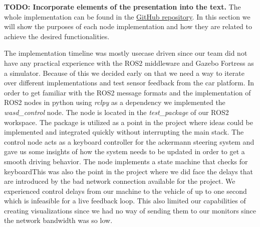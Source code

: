\textbf{TODO: Incorporate elements of the presentation into the text.} The whole implementation can be found in the \href{https://github.com/RUB-AVAI/race-car-buggy-busters}{GitHub repository}. In this section we will show the purposes of each node implementation and how they are related to achieve the desired functionalities.


The implementation timeline was mostly usecase driven since our team did not have any practical experience with the ROS2 middleware and Gazebo Fortress as a simulator. Because of this we decided early on that we need a way to iterate over different implementations and test sensor feedback from the car platform. In order to get familiar with the ROS2 message formats and the implementation of ROS2 nodes in python using \textit{rclpy} as a dependency we implemented the \textit{wasd\_control} node. The node is located in the \textit{test\_package} of our ROS2 workspace. The package is utilized as a point in the project where ideas could be implemented and integrated quickly without interrupting the main stack. The control node acts as a keyboard controller for the ackermann steering system and gave us some insights of how the system needs to be updated in order to get a smooth driving behavior. The node implements a state machine that checks for keyboardThis was also the point in the project where we did face the delays that are introduced by the bad network connection available for the project. We experienced control delays from our machine to the vehicle of up to one second which is infeasible for a live feedback loop. This also limited our capabilities of creating visualizations since we had no way of sending them to our monitors since the network bandwidth was so low.


